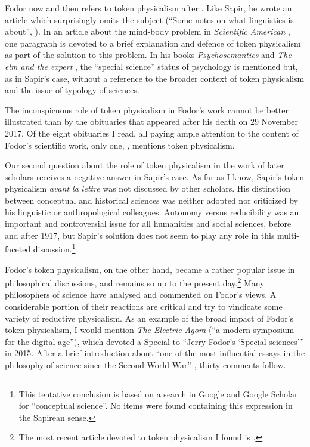 \documentclass[output=paper]{langscibook}
\begin{document}
Fodor now and then refers to token physicalism after \citeyear{Fodor1975}. Like Sapir, he wrote an article which surprisingly omits the subject (``Some notes on what linguistics is about'', \citeyear{Fodor1985}). In an article about the mind-body problem in \emph{Scientific American} \citep{Fodor1981}, one paragraph is devoted to a brief explanation and defence of token physicalism as part of the solution to this problem. In his books \emph{Psychosemantics} \citep[5-6]{Fodor1987} and \emph{The elm and the expert} \citep[39]{Fodor1994}, the ``special science'' status of psychology is mentioned but, as in Sapir's case, without a reference to the broader context of token physicalism and the issue of typology of sciences.

The inconspicuous role of token physicalism in Fodor's work cannot be better illustrated than by the obituaries that appeared after his death on 29 November 2017. Of the eight obituaries I read, all paying ample attention to the content of Fodor's scientific work, only one, \citet{Rey2017}, mentions token physicalism.

Our second question about the role of token physicalism in the work of later scholars receives a negative answer in Sapir's case. As far as I know, Sapir's token physicalism \emph{avant la lettre} was not discussed by other scholars. His distinction between conceptual and historical sciences was neither adopted nor criticized by his linguistic or anthropological colleagues. Autonomy versus reducibility was an important and controversial issue for all humanities and social sciences, before and after 1917, but Sapir's solution does not seem to play any role in this multi-faceted discussion.\footnote{This tentative conclusion is based on a search in Google and Google Scholar for ``conceptual science''. No items were found containing this expression in the Sapirean sense.}

Fodor's token physicalism, on the other hand, became a rather popular issue in philosophical discussions, and remains so up to the present day.\footnote{The most recent article devoted to token physicalism I found is \citet{DiFrisco2017}.} Many philosophers of science have analysed and commented on Fodor's views. A considerable portion of their reactions are critical and try to vindicate some variety of reductive physicalism. As an example of the broad impact of Fodor's token physicalism, I would mention \emph{The Electric Agora} (``a modern symposium for the digital age''), which devoted a Special to ``Jerry Fodor's `Special sciences''' in 2015. After a brief introduction about ``one of the most influential essays in the philosophy of science since the Second World War'' \citep[1-2]{Kaufman2015}, thirty comments follow.
\end{document}
